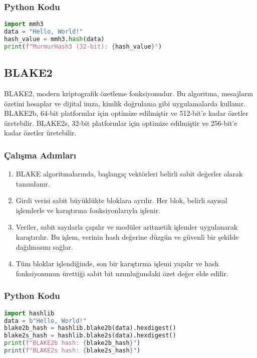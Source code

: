 \subsubsection{Python Kodu}

\begin{lstlisting}[language=Python]
import mmh3
data = "Hello, World!"
hash_value = mmh3.hash(data)
print(f"MurmurHash3 (32-bit): {hash_value}")
\end{lstlisting}

\newpage

\subsection{BLAKE2}

BLAKE2, modern kriptografik özetleme fonksiyonudur. Bu algoritma, mesajların özetini hesaplar ve dijital imza, kimlik doğrulama gibi uygulamalarda kullanır. BLAKE2b, 64-bit platformlar için optimize edilmiştir ve 512-bit'e kadar özetler üretebilir. BLAKE2s, 32-bit platformlar için optimize edilmiştir ve 256-bit'e kadar özetler üretebilir.

\subsubsection{Çalışma Adımları}

\begin{enumerate}
    \item BLAKE algoritmalarında, başlangıç vektörleri belirli sabit değerler olarak tanımlanır.
    \item Girdi verisi sabit büyüklükte bloklara ayrılır. Her blok, belirli sayısal işlemlerle ve karıştırma fonksiyonlarıyla işlenir.
    \item Veriler, sabit sayılarla çapılır ve modüler aritmetik işlemler uygulanarak karıştırılır. Bu işlem, verinin hash değerine düzgün ve güvenli bir şekilde dağılmasını sağlar.
    \item Tüm bloklar işlendiğinde, son bir karıştırma işlemi yapılır ve hash fonksiyonunun ürettiği sabit bit uzunluğundaki özet değer elde edilir.
\end{enumerate}

\subsubsection{Python Kodu}

\begin{lstlisting}[language=Python]
import hashlib
data = b"Hello, World!"
blake2b_hash = hashlib.blake2b(data).hexdigest()
blake2s_hash = hashlib.blake2s(data).hexdigest()
print(f"BLAKE2b hash: {blake2b_hash}")
print(f"BLAKE2s hash: {blake2s_hash}")
\end{lstlisting}

